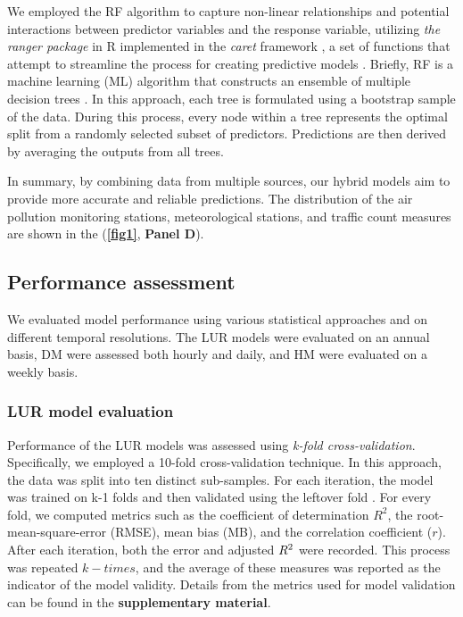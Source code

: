 \documentclass{article}
\begin{document}
We employed the RF algorithm to capture non-linear relationships and potential interactions between predictor variables and the response variable, utilizing \textit{the ranger package} in R implemented in the \textit{caret} framework \cite{wright2019}, a set of functions that attempt to streamline the process for creating predictive models \cite{caret2008}. Briefly, RF is a machine learning (ML) algorithm that constructs an ensemble of multiple decision trees \cite{breiman2001}. In this approach, each tree is formulated using a bootstrap sample of the data. During this process, every node within a tree represents the optimal split from a randomly selected subset of predictors. Predictions are then derived by averaging the outputs from all trees.

In summary, by combining data from multiple sources, our hybrid models aim to provide more accurate and reliable predictions. The distribution of the air pollution monitoring stations, meteorological stations, and traffic count measures are shown in the (\textbf{\cref{fig1}}, \textbf{Panel D}). 

\subsection{Performance assessment}

We evaluated model performance using various statistical approaches and on different temporal resolutions. The LUR models were evaluated on an annual basis, DM were assessed both hourly and daily, and HM were evaluated on a weekly basis.

\subsubsection{LUR model evaluation}
Performance of the LUR models was assessed using \textit{k-fold cross-validation}. Specifically, we employed a 10-fold cross-validation technique. In this approach, the data was split into ten distinct sub-samples. For each iteration, the model was trained on k-1 folds and then validated using the leftover fold \cite{ziegel2003}. For every fold, we computed metrics such as the coefficient of determination \(R^2\), the root-mean-square-error (RMSE), mean bias (MB), and the correlation coefficient (\(r\)). After each iteration, both the error and adjusted \(R\textsuperscript{2}\) were recorded. This process was repeated \(k-times\), and the average of these measures was reported as the indicator of the model validity. Details from the metrics used for model validation can be found in the \textbf{supplementary material}.\\
\end{document}
